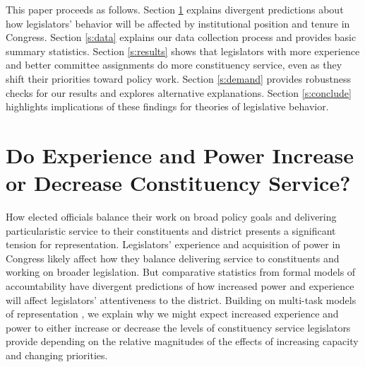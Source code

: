 \documentclass[12pt]{article}
\begin{document}
This paper proceeds as follows. Section \ref{s:theory} explains divergent predictions about how legislators' behavior will be affected by institutional position and tenure in Congress. Section \ref{s:data} explains our data collection process and provides basic summary statistics. Section \ref{s:results} shows that legislators with more experience and better committee assignments do more constituency service, even as they shift their priorities toward policy work. Section \ref{s:demand} provides robustness checks for our results and explores alternative explanations. Section \ref{s:conclude} highlights implications of these findings for theories of legislative behavior.





\section{Do Experience and Power Increase or Decrease Constituency Service?} \label{s:theory}



How elected officials balance their work on broad policy goals and delivering particularistic service to their constituents and district presents a significant tension for representation. Legislators' experience and acquisition of power in Congress likely affect how they balance delivering service to constituents and working on broader legislation. But comparative statistics from formal models of accountability have divergent predictions of how increased power and experience will affect legislators' attentiveness to the district. Building on multi-task models of representation \citep{AshworthBuenodeMesquita2006, gordon2009advantages}, we explain why we might expect increased experience and power to either increase or decrease the levels of constituency service legislators provide depending on the relative magnitudes of the effects of increasing capacity and changing priorities.

\end{document}
